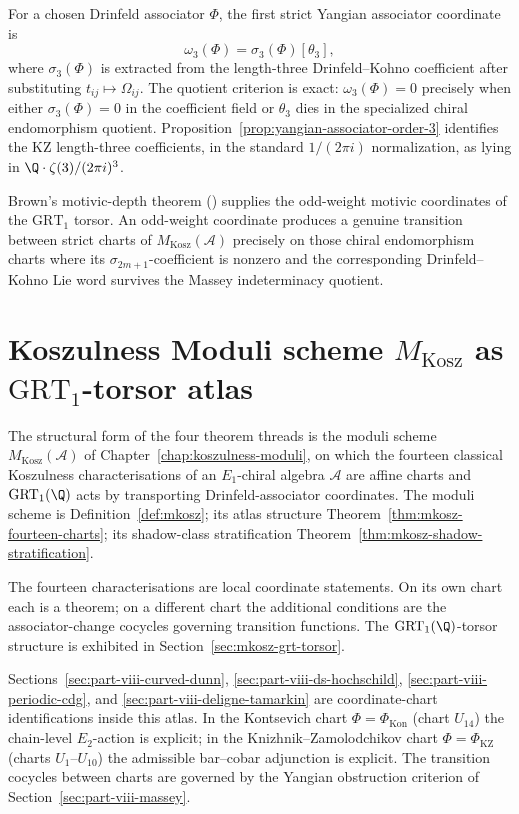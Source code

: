 For a chosen Drinfeld associator \(\Phi\), the first strict
Yangian associator coordinate is
\[
\omega_3(\Phi)=\sigma_3(\Phi)[\theta_3],
\]
where \(\sigma_3(\Phi)\) is extracted from the length-three
Drinfeld--Kohno coefficient after substituting
\(t_{ij}\mapsto\Omega_{ij}\). The quotient criterion is exact:
\(\omega_3(\Phi)=0\) precisely when either
\(\sigma_3(\Phi)=0\) in the coefficient field or
\(\theta_3\) dies in the specialized chiral endomorphism quotient.
Proposition~\ref{prop:yangian-associator-order-3} identifies the KZ
length-three coefficients, in the standard \(1/(2\pi i)\)
normalization, as lying in
\(\Q\cdot\zeta(3)/(2\pi i)^3\).

Brown's motivic-depth theorem (\cite{BrownMixedTate}) supplies the
odd-weight motivic coordinates of the $\mathrm{GRT}_{1}$ torsor.
An odd-weight coordinate produces a genuine transition between strict
charts of \(M_{\mathrm{Kosz}}(\mathcal A)\) precisely on those chiral
endomorphism charts where its \(\sigma_{2m+1}\)-coefficient is nonzero
and the corresponding Drinfeld--Kohno Lie word survives the Massey
indeterminacy quotient.

\section{Koszulness Moduli scheme $M_{\mathrm{Kosz}}$ as $\mathrm{GRT}_{1}$-torsor atlas}
\label{sec:part-viii-koszulness-moduli}

The structural form of the four theorem threads is the moduli scheme
$M_{\mathrm{Kosz}}(\mathcal{A})$ of Chapter~\ref{chap:koszulness-moduli},
on which the fourteen classical Koszulness characterisations of an
$E_{1}$-chiral algebra $\mathcal{A}$ are affine charts and
$\mathrm{GRT}_{1}(\Q)$ acts by transporting Drinfeld-associator
coordinates. The moduli scheme is Definition~\ref{def:mkosz}; its
atlas structure Theorem~\ref{thm:mkosz-fourteen-charts}; its
shadow-class stratification Theorem~\ref{thm:mkosz-shadow-stratification}.

The fourteen characterisations are local coordinate statements. On
its own chart each is a theorem; on a different chart the additional
conditions are the associator-change cocycles governing transition
functions. The $\mathrm{GRT}_{1}(\Q)$-torsor structure is exhibited in
Section~\ref{sec:mkosz-grt-torsor}.

Sections~\ref{sec:part-viii-curved-dunn},
\ref{sec:part-viii-ds-hochschild},
\ref{sec:part-viii-periodic-cdg}, and
\ref{sec:part-viii-deligne-tamarkin} are coordinate-chart
identifications inside this atlas. In the Kontsevich chart
$\Phi = \Phi_{\mathrm{Kon}}$ (chart $U_{14}$) the chain-level
$E_{2}$-action is explicit; in the Knizhnik--Zamolodchikov chart
$\Phi = \Phi_{\mathrm{KZ}}$ (charts $U_{1}$--$U_{10}$) the admissible
bar--cobar adjunction is explicit. The transition cocycles between
charts are governed by the Yangian obstruction criterion of
Section~\ref{sec:part-viii-massey}.

